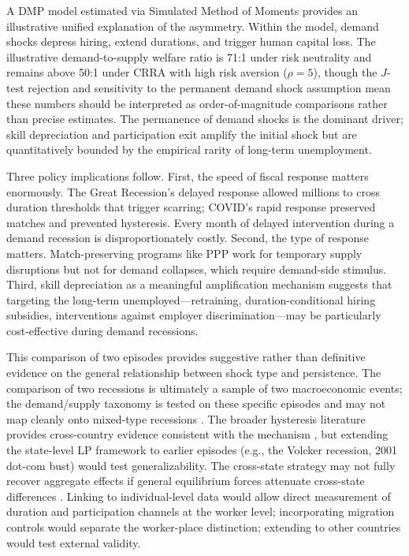 \documentclass[12pt]{article}
\begin{document}
A DMP model estimated via Simulated Method of Moments provides an illustrative unified explanation of the asymmetry. Within the model, demand shocks depress hiring, extend durations, and trigger human capital loss. The illustrative demand-to-supply welfare ratio is 71:1 under risk neutrality and remains above 50:1 under CRRA with high risk aversion ($\rho = 5$), though the $J$-test rejection and sensitivity to the permanent demand shock assumption mean these numbers should be interpreted as order-of-magnitude comparisons rather than precise estimates. The permanence of demand shocks is the dominant driver; skill depreciation and participation exit amplify the initial shock but are quantitatively bounded by the empirical rarity of long-term unemployment.

Three policy implications follow. First, the speed of fiscal response matters enormously. The Great Recession's delayed response allowed millions to cross duration thresholds that trigger scarring; COVID's rapid response preserved matches and prevented hysteresis. Every month of delayed intervention during a demand recession is disproportionately costly. Second, the type of response matters. Match-preserving programs like PPP work for temporary supply disruptions but not for demand collapses, which require demand-side stimulus. Third, skill depreciation as a meaningful amplification mechanism suggests that targeting the long-term unemployed---retraining, duration-conditional hiring subsidies, interventions against employer discrimination---may be particularly cost-effective during demand recessions.

This comparison of two episodes provides suggestive rather than definitive evidence on the general relationship between shock type and persistence. The comparison of two recessions is ultimately a sample of two macroeconomic events; the demand/supply taxonomy is tested on these specific episodes and may not map cleanly onto mixed-type recessions \citep{guerrieri2022macroeconomic}. The broader hysteresis literature provides cross-country evidence consistent with the mechanism \citep{cerra2023hysteresis}, but extending the state-level LP framework to earlier episodes (e.g., the Volcker recession, 2001 dot-com bust) would test generalizability. The cross-state strategy may not fully recover aggregate effects if general equilibrium forces attenuate cross-state differences \citep{beraja2019geography}. Linking to individual-level data would allow direct measurement of duration and participation channels at the worker level; incorporating migration controls would separate the worker-place distinction; extending to other countries would test external validity.
\end{document}
